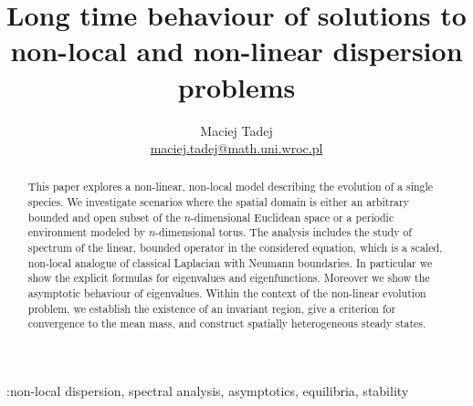 \documentclass[12pt, a4paper]{article}
\title{Long time behaviour of solutions to non-local and non-linear dispersion problems}
\author{Maciej Tadej \\ \href{mailto:maciej.tadej@math.uni.wroc.pl}{maciej.tadej@math.uni.wroc.pl}}
\affil{\textit{Insitute of Mathematics, University of Wrocław, pl. Grunwaldzki 2, 50-384 Wrocław}}
\date{}
\theoremstyle{break}
\theoremstyle{break}
\theoremstyle{break}
\theoremstyle{break}
\theoremstyle{break}
\begin{document}
\maketitle

\hspace{20pt}

\begin{abstract}
This paper explores a non-linear, non-local model describing the evolution of a single species. We investigate scenarios where the spatial domain is either an arbitrary bounded and open subset of the $n$-dimensional Euclidean space or a periodic environment modeled by $n$-dimensional torus. The analysis includes the study of spectrum of the linear, bounded operator in the considered equation, which is a scaled, non-local analogue of classical Laplacian with Neumann boundaries. In particular we show the explicit formulas for eigenvalues and eigenfunctions. Moreover we show the asymptotic behaviour of eigenvalues. Within the context of the non-linear evolution problem, we establish the existence of an invariant region, give a criterion for convergence to the mean mass, and construct spatially heterogeneous steady states.
\end{abstract}

\begin{keywords} :non-local dispersion, spectral analysis, asymptotics, equilibria, stability
\end{keywords}
\end{document}
